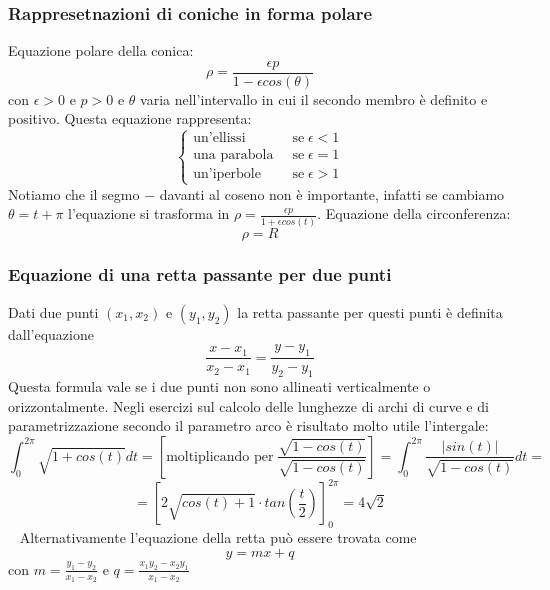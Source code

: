 \subsubsection{Rappresetnazioni di coniche in forma polare}
Equazione polare della conica:
\[
        \rho = \frac{\epsilon p}{1- \epsilon cos(\theta)}
\]
con $\epsilon > 0$ e $p> 0$ e $\theta$ varia nell'intervallo in cui il secondo membro è definito e positivo.\newline
Questa equazione rappresenta:
\[
    \begin{cases}
        \text{un'ellissi} \;\; &\text{se} \; \epsilon< 1\\
        \text{una parabola} \;\; &\text{se} \; \epsilon= 1\\
        \text{un'iperbole} \;\; &\text{se} \; \epsilon> 1
    \end{cases}
\]
Notiamo che il segmo $-$ davanti al coseno non è importante, infatti se cambiamo $\theta = t + \pi$ l'equazione si trasforma in $\rho = \frac{\epsilon p}{1 + \epsilon cos(t)}$.\newline
Equazione della circonferenza:
\[
        \rho = R
\]
\subsubsection{Equazione di una retta passante per due punti}
Dati due punti $(x_1, x_2)$ e $(y_1, y_2)$ la retta passante per questi punti è definita dall'equazione
\[
    \frac{x-x_1}{x_2-x_1} = \frac{y-y_1}{y_2-y_1}
\]
Questa formula vale se i due punti non sono allineati verticalmente o orizzontalmente.\newline
\newline
Negli esercizi sul calcolo delle lunghezze di archi di curve e di parametrizzazione secondo il parametro arco è risultato molto utile l'intergale:
\[
    \int_{0}^{2\pi} \sqrt{1 + cos(t)}dt = \left[\text{moltiplicando per} \; \frac{\sqrt{1-cos(t)}}{\sqrt{1-cos(t)}}\right] = \int_{0}^{2\pi}\frac{|sin(t)|}{\sqrt{1-cos(t)}}dt =
\]
\[
    = [2 \sqrt{cos(t) +1}\cdot  tan(\frac{t}{2}) ]_0^{2\pi} = 4 \sqrt{2}
\]
\ \newline
Alternativamente l'equazione della retta può essere trovata come
\[
    y = m x + q
\]
con $m = \frac{y_1 - y_2}{x_1-x_2}$ e $q = \frac{x_1 y_2 - x_2 y_1}{x_1-x_2}$
